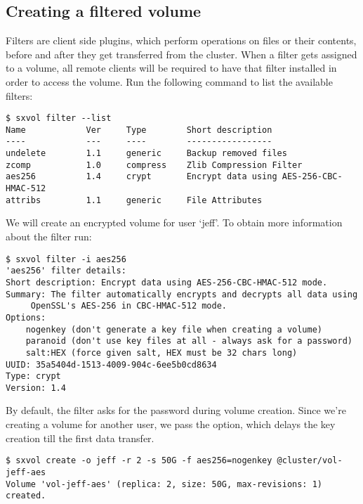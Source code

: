 \subsection{Creating a filtered volume}
Filters are client side plugins, which perform operations on files or their contents, before
and after they get transferred from the \SX cluster. When a filter gets assigned to a volume,
all remote clients will be required to have that filter installed in order to access the volume.
Run the following command to list the available filters:
\begin{lstlisting}
$ sxvol filter --list
Name            Ver     Type        Short description
----            ---     ----        -----------------
undelete        1.1     generic     Backup removed files
zcomp           1.0     compress    Zlib Compression Filter
aes256          1.4     crypt	    Encrypt data using AES-256-CBC-HMAC-512
attribs         1.1     generic     File Attributes
\end{lstlisting}
We will create an encrypted volume for user `jeff'. To obtain more information
about the  filter run:
\begin{lstlisting}
$ sxvol filter -i aes256
'aes256' filter details:
Short description: Encrypt data using AES-256-CBC-HMAC-512 mode.
Summary: The filter automatically encrypts and decrypts all data using
	 OpenSSL's AES-256 in CBC-HMAC-512 mode.
Options: 
	nogenkey (don't generate a key file when creating a volume)
	paranoid (don't use key files at all - always ask for a password)
	salt:HEX (force given salt, HEX must be 32 chars long)
UUID: 35a5404d-1513-4009-904c-6ee5b0cd8634
Type: crypt
Version: 1.4
\end{lstlisting}
By default, the  filter asks for the password during volume
creation. Since we're creating a volume for another user, we pass the
 option, which delays the key creation till the first data
transfer.
\begin{lstlisting}
$ sxvol create -o jeff -r 2 -s 50G -f aes256=nogenkey @cluster/vol-jeff-aes
Volume 'vol-jeff-aes' (replica: 2, size: 50G, max-revisions: 1) created.
\end{lstlisting}

